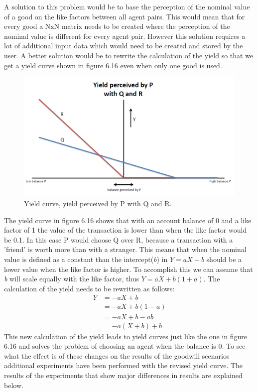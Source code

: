 \documentclass[twoside,openright]{uva-bachelor-thesis}
\begin{document}
A solution to this problem would be to base the perception of the nominal value of a good on the like factors between all agent pairs. This would mean that for every good a NxN matrix needs to be created where the perception of the nominal value is different for every agent pair. However this solution requires a lot of additional input data which would need to be created and stored by the user. A better solution would be to rewrite the calculation of the yield so that we get a yield curve shown in figure 6.16 even when only one good is used. \\
\begin{figure}[h!]
\centering
\includegraphics[scale=0.4]{YieldCurves/yieldcurve_P_QR2}
\caption{Yield curve, yield perceived by P with Q and R.}
\end{figure}

The yield curve in figure 6.16 shows that with an account balance of 0 and a like factor of 1 the value of the transaction is lower than when the like factor would be 0.1. In this case P would choose Q over R, because a transaction with a 'friend' is worth more than with a stranger. This means that when the nominal value is defined as a constant than the intercept(\textit{b}) in \textit{$Y = aX + b$} should be a lower value when the like factor is higher. To accomplish this we can assume that \textit{b} will scale equally with the like factor, thus \textit{$Y = aX + b(1 + a)$}. The calculation of the yield needs to be rewritten as follows:
\begin{equation}
\begin{split}
Y & = -aX + b \\
& = -aX + b(1 - a) \\
& = -aX + b - ab \\
& = -a(X + b) + b 
\end{split}
\end{equation}
This new calculation of the yield leads to yield curves just like the one in figure 6.16 and solves the problem of choosing an agent when the balance is 0. To see what the effect is of these changes on the results of the goodwill scenarios additional experiments have been performed with the revised yield curve. The results of the experiments that show major differences in results are explained below.
\end{document}
